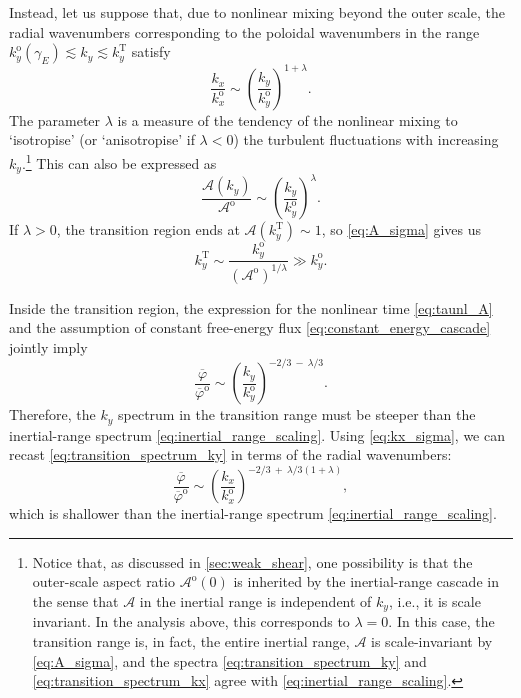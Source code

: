 \documentclass{jpp}
\newcommand{\phinorm}{\varphi}
\newcommand{\phinormk}{\overline{\phinorm}}
\newcommand{\phinormko}{\overline{\phinorm}^\text{o}}
\newcommand{\kxo}{k_x^\text{o}}
\newcommand{\kyo}{k_y^\text{o}}
\newcommand{\gammaE}{\gamma_{E}}
\newcommand{\A}{\mathcal{A}}
\newcommand{\Ao}{\A^\text{o}}
\newcommand{\AoO}{\A^\text{o}(0)}
\begin{document}
Instead, let us suppose that, due to nonlinear mixing beyond the outer scale, the radial wavenumbers corresponding to the poloidal wavenumbers in the range \mbox{\(\kyo(\gammaE) \lesssim k_y \lesssim k_y^\text{T}\)} satisfy
\begin{equation}
	\frac{k_x}{\kxo} \sim \left(\frac{k_y}{\kyo}\right)^{1+\lambda}.
	\label{eq:kx_sigma}
\end{equation}
The parameter \(\lambda\) is a measure of the tendency of the nonlinear mixing to `isotropise' (or `anisotropise' if \mbox{\(\lambda < 0\)}) the turbulent fluctuations with increasing \(k_y\).\footnote{Notice that, as discussed in \cref{sec:weak_shear}, one possibility is that the outer-scale aspect ratio \(\AoO\) is inherited by the inertial-range cascade in the sense that \(\A\) in the inertial range is independent of \(k_y\), i.e., it is scale invariant. In the analysis above, this corresponds to \(\lambda = 0\). In this case, the transition range is, in fact, the entire inertial range, \(\A\) is scale-invariant by \cref{eq:A_sigma}, and the spectra \cref{eq:transition_spectrum_ky} and \cref{eq:transition_spectrum_kx} agree with \cref{eq:inertial_range_scaling}.} This can also be expressed as
\begin{equation}
	\frac{\A(k_y)}{\Ao} \sim \left(\frac{k_y}{\kyo}\right)^\lambda.
	\label{eq:A_sigma}
\end{equation} 
If \(\lambda > 0\), the transition region ends at \(\A(k_y^\text{T}) \sim 1\), so \cref{eq:A_sigma} gives us
\begin{equation}
	k_y^\text{T}  \sim \frac{\kyo}{(\Ao)^{1/\lambda}} \gg \kyo.
\end{equation}

Inside the transition region, the expression for the nonlinear time \cref{eq:taunl_A} and the assumption of constant free-energy flux \cref{eq:constant_energy_cascade} jointly imply
\begin{equation}
	\frac{\phinormk}{\phinormko} \sim \left(\frac{k_y}{\kyo}\right)^{-2/3 \ - \ \lambda/3}.
	\label{eq:transition_spectrum_ky}
\end{equation}
Therefore, the \(k_y\) spectrum in the transition range must be steeper than the inertial-range spectrum \cref{eq:inertial_range_scaling}. Using \cref{eq:kx_sigma}, we can recast \cref{eq:transition_spectrum_ky} in terms of the radial wavenumbers:
\begin{equation}
	\frac{\phinormk}{\phinormko} \sim \left(\frac{k_x}{\kxo}\right)^{-2/3 \ + \ \lambda/3(1+\lambda)},
	\label{eq:transition_spectrum_kx}
\end{equation}
which is shallower than the inertial-range spectrum \cref{eq:inertial_range_scaling}. 
\end{document}
